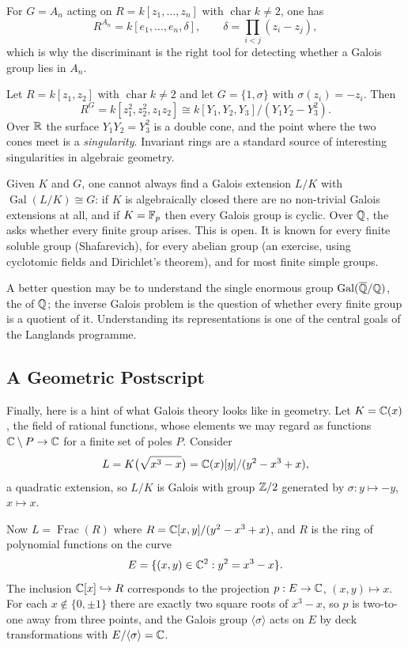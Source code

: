 \documentclass[a4paper]{scrartcl}
\newcommand{\charr}{\operatorname{char}}
\newcommand{\Gal}{\operatorname{Gal}}
\newcommand{\Frac}{\operatorname{Frac}}
\begin{document}
\begin{example}
	For $G = A_n$ acting on $R = k[z_1,\dots,z_n]$ with $\charr k \neq 2$, one has
	$$R^{A_n} = k[e_1,\dots,e_n,\delta], \qquad \delta = \prod_{i<j}(z_i-z_j),$$
	which is why the discriminant is the right tool for detecting whether a Galois group lies in $A_n$.
\end{example}

\begin{example}
	Let $R = k[z_1,z_2]$ with $\charr k \neq 2$ and let $G = \{1,\sigma\}$ with $\sigma(z_i)= -z_i$. Then
	$$R^G = k[z_1^2, z_2^2, z_1z_2]\cong k[Y_1,Y_2,Y_3]/(Y_1Y_2 - Y_3^2).$$
	Over $\mathbb{R}$ the surface $Y_1Y_2 = Y_3^2$ is a double cone, and the point where the two cones meet is a \emph{singularity}. Invariant rings are a standard source of interesting singularities in algebraic geometry.
\end{example}

Given $K$ and $G$, one cannot always find a Galois extension $L/K$ with $\Gal(L/K)\cong G$: if $K$ is algebraically closed there are no non-trivial Galois extensions at all, and if $K = \mathbb{F}_p$ then every Galois group is cyclic. Over $\mathbb{Q}$, the  asks whether every finite group arises. This is open. It is known for every finite soluble group (Shafarevich), for every abelian group (an exercise, using cyclotomic fields and Dirichlet's theorem), and for most finite simple groups.

A better question may be to understand the single enormous group $\Gal(\overline\Q/\Q)$, the  of $\mathbb{Q}$; the inverse Galois problem is the question of whether every finite group is a quotient of it. Understanding its representations is one of the central goals of the Langlands programme.

\subsection{A Geometric Postscript}

Finally, here is a hint of what Galois theory looks like in geometry. Let $K = \mathbb{C}(x)$, the field of rational functions, whose elements we may regard as functions $\mathbb{C}\setminus P \to \mathbb{C}$ for a finite set of poles $P$. Consider
$$L = K\big(\sqrt{x^3-x}\big) = \mathbb{C}(x)[y]/(y^2-x^3+x),$$
a quadratic extension, so $L/K$ is Galois with group $\mathbb{Z}/2$ generated by $\sigma : y \mapsto -y$, $x \mapsto x$.

Now $L = \Frac(R)$ where $R = \mathbb{C}[x,y]/(y^2-x^3+x)$, and $R$ is the ring of polynomial functions on the curve
$$E = \{(x,y)\in\mathbb{C}^2 : y^2 = x^3-x\}.$$
The inclusion $\mathbb{C}[x]\hookrightarrow R$ corresponds to the projection $p : E \to \mathbb{C}$, $(x,y)\mapsto x$. For each $x \notin\{0,\pm1\}$ there are exactly two square roots of $x^3-x$, so $p$ is two-to-one away from three points, and the Galois group $\langle\sigma\rangle$ acts on $E$ by deck transformations with $E/\langle\sigma\rangle = \mathbb{C}$.
\end{document}

